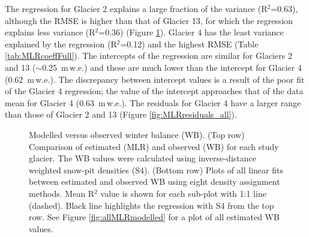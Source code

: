\documentclass{sfuthesis}
\begin{document}
{The regression for Glacier 2 explains a large fraction of the variance (R$^2$=0.63), although the RMSE is higher than that of Glacier 13, for which the regression explains less variance (R$^2$=0.36) (Figure \ref{fig:MLRfit}). Glacier 4 has the least variance explained by the regression (R$^2$=0.12) and the highest RMSE (Table \ref{tab:MLRcoeffFull}). The intercepts of the regression are similar for Glaciers 2 and 13 ($\sim$0.25 \,m\,w.e.) and these are much lower than the intercept for Glacier 4 (0.62 \,m\,w.e.). The discrepancy between intercept values is a result of the poor fit of the Glacier 4 regression; the value of the intercept approaches that of the data mean for Glacier 4 (0.63 \,m\,w.e.). The residuals for Glacier 4 have a larger range than those of Glacier 2 and 13 (Figure \ref{fig:MLRresiduals_all}).

\begin{figure}[H]
    \centering
    \begin{subfigure}[b]{\textwidth}
    \end{subfigure}
    
    \begin{subfigure}[b]{\textwidth}
    \end{subfigure}

    \caption[MLR-modelled versus observed winter balance]{Modelled versus observed winter balance (WB). (Top row) Comparison of estimated (MLR) and observed (WB) for each study glacier. The WB values were calculated using inverse-distance weighted snow-pit densities (S4). (Bottom row) Plots of all linear fits between estimated and observed WB using eight density assignment methods. Mean R$^2$ value is shown for each sub-plot with 1:1 line (dashed). Black line highlights the regression with S4 from the top row. See Figure \ref{fig:allMLRmodelled} for a plot of all estimated WB values.}
    \label{fig:MLRfit}
\end{figure}

}
\end{document}
